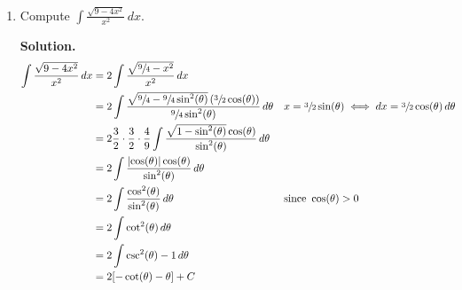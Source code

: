 \begin{Example}{}{}
    \begin{enumerate}[label=(\roman*)]
        \item Compute $ \displaystyle \int \frac{\sqrt{9-4x^2}}{x^2} \, d{x} $.

              \textbf{Solution.}
              \begin{align*}
                  \int \frac{\sqrt{9-4x^2}}{x^2} \, d{x}
                   & =2 \int \frac{\sqrt{\sfrac{9}{4}-x^2}}{x^2} \, d{x}                                                                                                                                                                    \\
                   & =2 \int \frac{\sqrt{\sfrac{9}{4}-\sfrac{9}{4}\sin^2(\theta)}\left( \sfrac{3}{2}\cos(\theta) \right)}{\sfrac{9}{4}\sin^2(\theta)} \, d{\theta} &  & x=\sfrac{3}{2}\sin(\theta)\iff dx=\sfrac{3}{2}\cos(\theta)\,d\theta \\
                   & =2 \frac{3}{2} \cdot \frac{3}{2} \cdot \frac{4}{9}
                  \int \frac{\sqrt{1-\sin^2(\theta)}\cos(\theta)}{\sin^2(\theta)} \, d{\theta}                                                                                                                                              \\
                   & =2 \int \frac{\abs{\cos(\theta)}\cos(\theta)}{\sin^2(\theta)} \, d{\theta}                                                                                                                                             \\
                   & =2 \int \frac{\cos^2(\theta)}{\sin^2(\theta)} \, d{\theta}                                                                                    &  & \text{since }\cos(\theta)>0                                         \\
                   & =2 \int \cot^2(\theta)\, d{\theta}                                                                                                                                                                                     \\
                   & =2 \int \csc^2(\theta)-1\, d{\theta}                                                                                                                                                                                   \\
                   & =2[-\cot(\theta)-\theta]+C                                                                                                                                                                                             \\

\end{align*}
\end{enumerate}
\end{Example}

